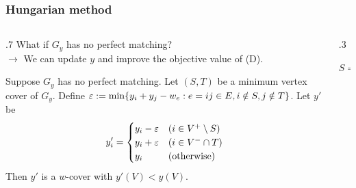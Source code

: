 \documentclass[14pt,aspectratio=169,xcolor=dvipsnames,table,onlytextwidth]{beamer}
\begin{document}
\begin{frame}
    \frametitle{Hungarian method}

    \small
    \begin{columns}[T]
    \begin{column}{.7\textwidth}
    What if $G_y$ has no perfect matching?\\
    $\longrightarrow$ We can update $y$ and improve the objective value of (D).
    
    \pause
    \begin{lemma}
        Suppose $G_y$ has no perfect matching.
        Let $(S, T)$ be a minimum vertex cover of $G_y$.
        Define
        $\varepsilon := \min\{ y_i + y_j - w_e : e = ij \in E, i \notin S, j \notin T \}$.
        Let $y'$ be
            \setlength{\abovedisplayskip}{0pt}
        \[
        y'_i =
        \begin{cases}
            y_i - \varepsilon & (i \in V^+ \setminus S) \\
            y_i + \varepsilon & (i \in V^- \cap T) \\
            y_i        & (\text{otherwise})
        \end{cases}
        \]
        Then $y'$ is a $w$-cover with $y'(V) < y(V)$.
    \end{lemma}
    \end{column}
    \begin{column}{.3\textwidth}
    \begin{center}
    \end{center}
    \hspace{1em} $S = \emptyset$
    \end{column}
    \end{columns}

\end{frame}
\end{document}
